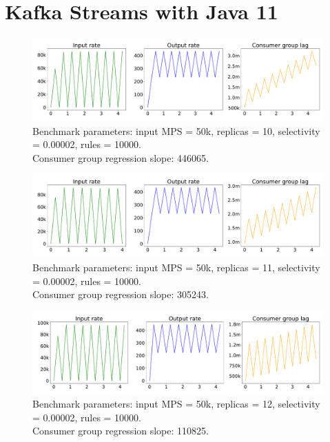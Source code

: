 
\section{Kafka Streams with Java 11}\label{sec:kafka-streams-on-java-11}

\begin{figure}[H]
    \centering
    \includegraphics[width=1\textwidth]{figures/k-streams-java-11-replicas-10}
    \caption{Benchmark parameters: input MPS = 50k, replicas = 10, selectivity = 0.00002, rules = 10000. \\
    Consumer group regression slope: 446065.}
    \label{fig:k-streams-java-11-replicas-10}
\end{figure}

\begin{figure}[H]
    \centering
    \includegraphics[width=1\textwidth]{figures/k-streams-java-11-replicas-11}
    \caption{Benchmark parameters: input MPS = 50k, replicas = 11, selectivity = 0.00002, rules = 10000. \\
    Consumer group regression slope: 305243.}
    \label{fig:k-streams-java-11-replicas-11}
\end{figure}

\begin{figure}[H]
    \centering
    \includegraphics[width=1\textwidth]{figures/k-streams-java-11-replicas-12}
    \caption{Benchmark parameters: input MPS = 50k, replicas = 12, selectivity = 0.00002, rules = 10000. \\
    Consumer group regression slope: 110825.}
    \label{fig:k-streams-java-11-replicas-12}
\end{figure}

